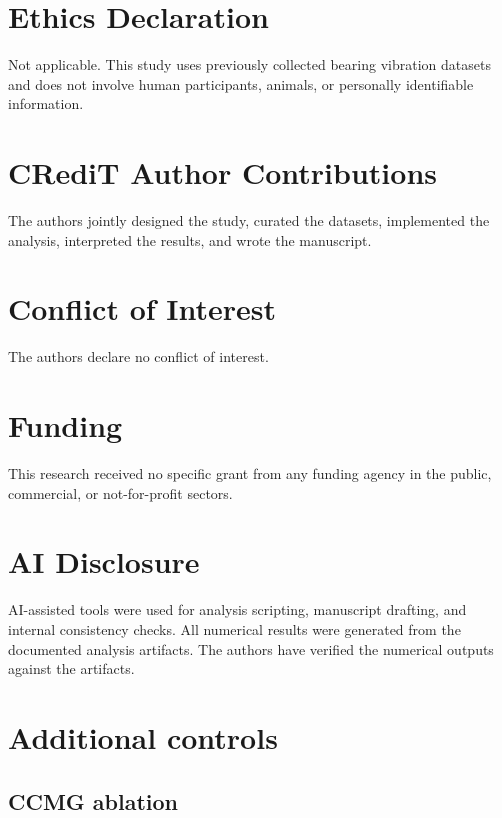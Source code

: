 \documentclass[11pt]{article}
\begin{document}
\section*{Ethics Declaration}

Not applicable. This study uses previously collected bearing vibration
datasets and does not involve human participants, animals, or personally
identifiable information.

\section*{CRediT Author Contributions}

The authors jointly designed the study, curated the datasets, implemented the
analysis, interpreted the results, and wrote the manuscript.

\section*{Conflict of Interest}

The authors declare no conflict of interest.

\section*{Funding}

This research received no specific grant from any funding agency in the
public, commercial, or not-for-profit sectors.

\section*{AI Disclosure}

AI-assisted tools were used for analysis scripting, manuscript drafting, and
internal consistency checks. All numerical results were generated from the
documented analysis artifacts. The authors have verified the numerical outputs
against the artifacts.

\clearpage
\appendix
\setcounter{figure}{0}
\renewcommand{\thefigure}{A\arabic{figure}}
\setcounter{table}{0}
\renewcommand{\thetable}{A\arabic{table}}

\section{Additional controls}

\subsection{CCMG ablation}
\end{document}
